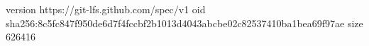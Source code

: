version https://git-lfs.github.com/spec/v1
oid sha256:8c5fc847f950de6d7f4fccbf2b1013d4043abcbe02c82537410ba1bea69f97ae
size 626416
